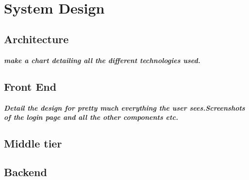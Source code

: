 \chapter{System Design}
\section{Architecture}
\paragraph{make a chart detailing all the different technologies used.}

\section{Front End}
\paragraph{Detail the design for pretty much everything the user sees.Screenshots of the login page and all the other components etc.}

\section{Middle tier}

\section{Backend}
